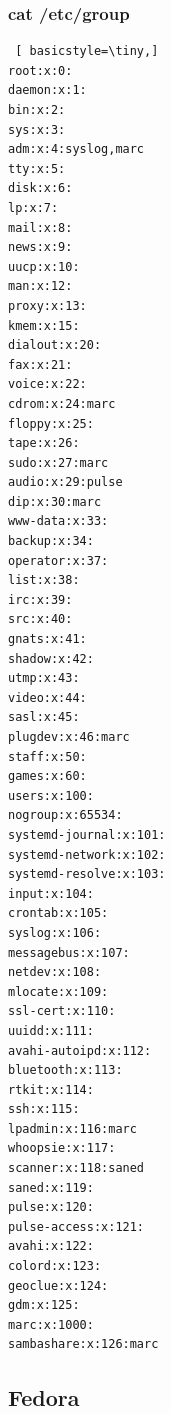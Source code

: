 \documentclass[preprint,11pt]{elsarticle}
\begin{document}
        \subsubsection{cat /etc/group}
\begin{lstlisting} [ basicstyle=\tiny,]
root:x:0:
daemon:x:1:
bin:x:2:
sys:x:3:
adm:x:4:syslog,marc
tty:x:5:
disk:x:6:
lp:x:7:
mail:x:8:
news:x:9:
uucp:x:10:
man:x:12:
proxy:x:13:
kmem:x:15:
dialout:x:20:
fax:x:21:
voice:x:22:
cdrom:x:24:marc
floppy:x:25:
tape:x:26:
sudo:x:27:marc
audio:x:29:pulse
dip:x:30:marc
www-data:x:33:
backup:x:34:
operator:x:37:
list:x:38:
irc:x:39:
src:x:40:
gnats:x:41:
shadow:x:42:
utmp:x:43:
video:x:44:
sasl:x:45:
plugdev:x:46:marc
staff:x:50:
games:x:60:
users:x:100:
nogroup:x:65534:
systemd-journal:x:101:
systemd-network:x:102:
systemd-resolve:x:103:
input:x:104:
crontab:x:105:
syslog:x:106:
messagebus:x:107:
netdev:x:108:
mlocate:x:109:
ssl-cert:x:110:
uuidd:x:111:
avahi-autoipd:x:112:
bluetooth:x:113:
rtkit:x:114:
ssh:x:115:
lpadmin:x:116:marc
whoopsie:x:117:
scanner:x:118:saned
saned:x:119:
pulse:x:120:
pulse-access:x:121:
avahi:x:122:
colord:x:123:
geoclue:x:124:
gdm:x:125:
marc:x:1000:
sambashare:x:126:marc
\end{lstlisting}

\clearpage
\subsection{Fedora}
\end{document}

